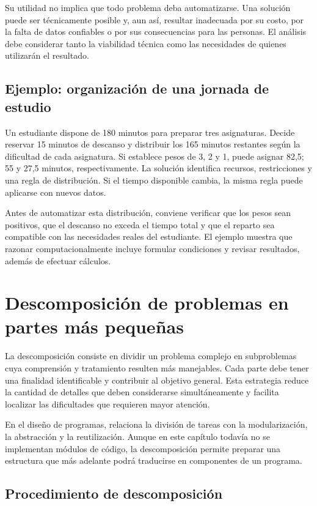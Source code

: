 Su utilidad no implica que todo problema deba automatizarse. Una solución puede ser técnicamente posible y, aun así, resultar inadecuada por su costo, por la falta de datos confiables o por sus consecuencias para las personas. El análisis debe considerar tanto la viabilidad técnica como las necesidades de quienes utilizarán el resultado.

\subsection{Ejemplo: organización de una jornada de estudio}

Un estudiante dispone de 180 minutos para preparar tres asignaturas. Decide reservar 15 minutos de descanso y distribuir los 165 minutos restantes según la dificultad de cada asignatura. Si establece pesos de 3, 2 y 1, puede asignar 82,5; 55 y 27,5 minutos, respectivamente. La solución identifica recursos, restricciones y una regla de distribución. Si el tiempo disponible cambia, la misma regla puede aplicarse con nuevos datos.

Antes de automatizar esta distribución, conviene verificar que los pesos sean positivos, que el descanso no exceda el tiempo total y que el reparto sea compatible con las necesidades reales del estudiante. El ejemplo muestra que razonar computacionalmente incluye formular condiciones y revisar resultados, además de efectuar cálculos.

\section{Descomposición de problemas en partes más pequeñas}

La descomposición consiste en dividir un problema complejo en subproblemas cuya comprensión y tratamiento resulten más manejables. Cada parte debe tener una finalidad identificable y contribuir al objetivo general. Esta estrategia reduce la cantidad de detalles que deben considerarse simultáneamente y facilita localizar las dificultades que requieren mayor atención.

En el diseño de programas, \textcite[pp.~48–50]{farrell2013} relaciona la división de tareas con la modularización, la abstracción y la reutilización. Aunque en este capítulo todavía no se implementan módulos de código, la descomposición permite preparar una estructura que más adelante podrá traducirse en componentes de un programa.

\subsection{Procedimiento de descomposición}

